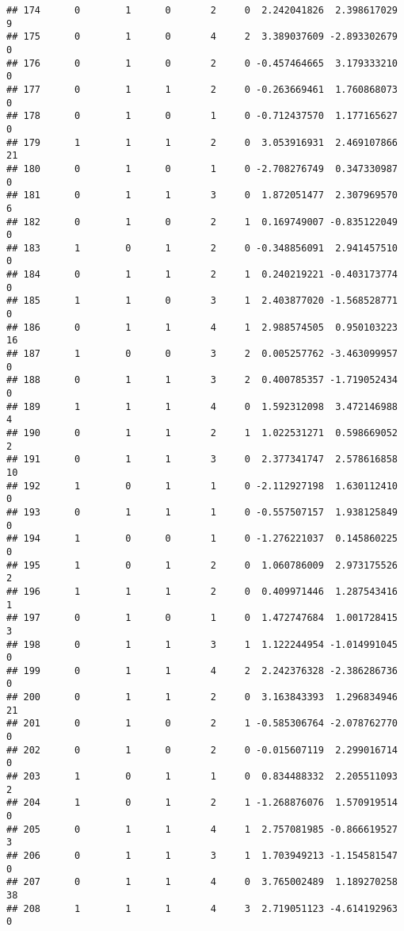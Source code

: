 \documentclass[]{article}
\begin{document}
\begin{verbatim}
## 174      0        1      0       2     0  2.242041826  2.398617029     9
## 175      0        1      0       4     2  3.389037609 -2.893302679     0
## 176      0        1      0       2     0 -0.457464665  3.179333210     0
## 177      0        1      1       2     0 -0.263669461  1.760868073     0
## 178      0        1      0       1     0 -0.712437570  1.177165627     0
## 179      1        1      1       2     0  3.053916931  2.469107866    21
## 180      0        1      0       1     0 -2.708276749  0.347330987     0
## 181      0        1      1       3     0  1.872051477  2.307969570     6
## 182      0        1      0       2     1  0.169749007 -0.835122049     0
## 183      1        0      1       2     0 -0.348856091  2.941457510     0
## 184      0        1      1       2     1  0.240219221 -0.403173774     0
## 185      1        1      0       3     1  2.403877020 -1.568528771     0
## 186      0        1      1       4     1  2.988574505  0.950103223    16
## 187      1        0      0       3     2  0.005257762 -3.463099957     0
## 188      0        1      1       3     2  0.400785357 -1.719052434     0
## 189      1        1      1       4     0  1.592312098  3.472146988     4
## 190      0        1      1       2     1  1.022531271  0.598669052     2
## 191      0        1      1       3     0  2.377341747  2.578616858    10
## 192      1        0      1       1     0 -2.112927198  1.630112410     0
## 193      0        1      1       1     0 -0.557507157  1.938125849     0
## 194      1        0      0       1     0 -1.276221037  0.145860225     0
## 195      1        0      1       2     0  1.060786009  2.973175526     2
## 196      1        1      1       2     0  0.409971446  1.287543416     1
## 197      0        1      0       1     0  1.472747684  1.001728415     3
## 198      0        1      1       3     1  1.122244954 -1.014991045     0
## 199      0        1      1       4     2  2.242376328 -2.386286736     0
## 200      0        1      1       2     0  3.163843393  1.296834946    21
## 201      0        1      0       2     1 -0.585306764 -2.078762770     0
## 202      0        1      0       2     0 -0.015607119  2.299016714     0
## 203      1        0      1       1     0  0.834488332  2.205511093     2
## 204      1        0      1       2     1 -1.268876076  1.570919514     0
## 205      0        1      1       4     1  2.757081985 -0.866619527     3
## 206      0        1      1       3     1  1.703949213 -1.154581547     0
## 207      0        1      1       4     0  3.765002489  1.189270258    38
## 208      1        1      1       4     3  2.719051123 -4.614192963     0

\end{verbatim}
\end{document}
